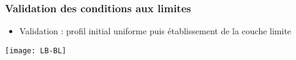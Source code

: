 \documentclass[12pt, xcolor=svgnames]{beamer}
\newcommand{\bwarrow}{\item[\color{DarkRed} \ding{227}]}
\newcommand{\warrow}{\item[\color{blue!50!black!70} \tiny{\ding{109}}]}
\newcommand{\sarrow}{\item[\color{blue!50!black!70!orange!60} \tiny{\ding{55}}]}
\begin{document}
%
%
%

\begin{frame}
\frametitle{Validation des conditions aux limites}
\begin{itemize}
	\bwarrow Validation : profil initial uniforme puis établissement de la couche limite
\end{itemize}

\centering
\texttt{[image: LB-BL]}

\end{frame}

\end{document}
